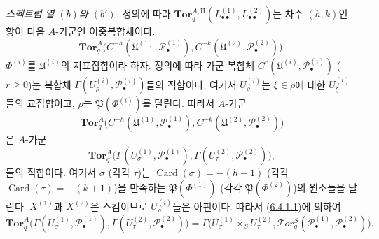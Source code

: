 \begin{env}[6.6.4]
\label{III.6.6.4-fr}
\emph{스펙트럼 열 $(b)$와 $(b')$.}
정의에 따라
$\mathbf{Tor}_q^{A,\mathrm{II}}
(L_{\bullet\bullet}^{(1)},L_{\bullet\bullet}^{(2)})$는 차수 $(h,k)$인
항이 다음 $A$-가군인 이중복합체이다.
\[
  \mathbf{Tor}_q^A
  \bigl(C^{-h}(\mathfrak U^{(1)},\mathscr P_\bullet^{(1)}),
        C^{-k}(\mathfrak U^{(2)},\mathscr P_\bullet^{(2)})\bigr).
\]
$\Phi^{(i)}$를 $\mathfrak U^{(i)}$의 지표집합이라 하자. 정의에 따라
가군 복합체
$C^r(\mathfrak U^{(i)},\mathscr P_\bullet^{(i)})$ ($r\geqslant0$)는
복합체 $\Gamma(U_\rho^{(i)},\mathscr P_\bullet^{(i)})$들의 직합이다.
여기서 $U_\rho^{(i)}$는 $\xi\in\rho$에 대한
$U_\xi^{(i)}$들의 교집합이고, $\rho$는
$\mathfrak P(\Phi^{(i)})$를 달린다. 따라서 $A$-가군
\[
  \mathbf{Tor}_q^A
  \bigl(C^{-h}(\mathfrak U^{(1)},\mathscr P_\bullet^{(1)}),
        C^{-k}(\mathfrak U^{(2)},\mathscr P_\bullet^{(2)})\bigr)
\]
은 $A$-가군
\[
  \mathbf{Tor}_q^A
  \bigl(\Gamma(U_\sigma^{(1)},\mathscr P_\bullet^{(1)}),
        \Gamma(U_\tau^{(2)},\mathscr P_\bullet^{(2)})\bigr),
\]
들의 직합이다. 여기서 $\sigma$ (각각 $\tau$)는
$\operatorname{Card}(\sigma)=-(h+1)$ (각각
$\operatorname{Card}(\tau)=-(k+1)$)을 만족하는
$\mathfrak P(\Phi^{(1)})$ (각각 $\mathfrak P(\Phi^{(2)})$)의 원소들을
달린다.
$X^{(1)}$과 $X^{(2)}$은 스킴이므로 $U_\rho^{(i)}$들은 아핀이다.
따라서 (\hyperref[III.6.4.1.1.fr]{6.4.1.1})에 의하여
\[
  \mathbf{Tor}_q^A
  \bigl(\Gamma(U_\sigma^{(1)},\mathscr P_\bullet^{(1)}),
        \Gamma(U_\tau^{(2)},\mathscr P_\bullet^{(2)})\bigr)
  =\Gamma\bigl(U_\sigma^{(1)}\times_S U_\tau^{(2)},
    \mathscr{T}\!or_q^S
    (\mathscr P_\bullet^{(1)},\mathscr P_\bullet^{(2)})\bigr).
\]



\end{env}

